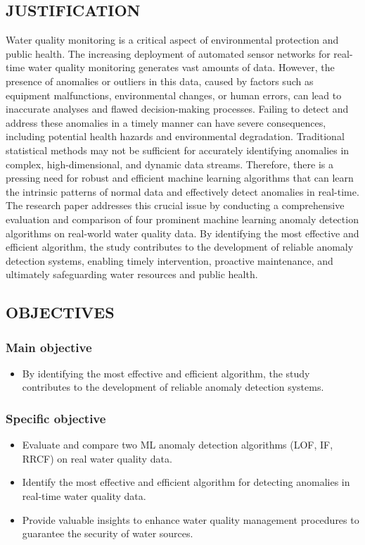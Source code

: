 \documentclass[12pt]{report}
\begin{document}
\subsection{JUSTIFICATION}
\par
Water quality monitoring is a critical aspect of environmental protection and public health. The increasing deployment of automated sensor networks for real-time water quality monitoring generates vast amounts of data. However, the presence of anomalies or outliers in this data, caused by factors such as equipment malfunctions, environmental changes, or human errors, can lead to inaccurate analyses and flawed decision-making processes. Failing to detect and address these anomalies in a timely manner can have severe consequences, including potential health hazards and environmental degradation. Traditional statistical methods may not be sufficient for accurately identifying anomalies in complex, high-dimensional, and dynamic data streams. Therefore, there is a pressing need for robust and efficient machine learning algorithms that can learn the intrinsic patterns of normal data and effectively detect anomalies in real-time. The research paper addresses this crucial issue by conducting a comprehensive evaluation and comparison of four prominent machine learning anomaly detection algorithms on real-world water quality data. By identifying the most effective and efficient algorithm, the study contributes to the development of reliable anomaly detection systems, enabling timely intervention, proactive maintenance, and ultimately safeguarding water resources and public health.
\subsection{OBJECTIVES}
\subsubsection{Main objective}
\begin{itemize}
    \item By identifying the most effective and efficient algorithm, the study contributes to the development of reliable anomaly detection systems.
\end{itemize}
\subsubsection{Specific objective}
\begin{itemize}
    \item Evaluate and compare two ML anomaly detection algorithms (LOF, IF, RRCF) on real water quality data.
\item Identify the most effective and efficient algorithm for detecting anomalies in real-time water quality data.
\item  Provide valuable insights  to enhance  water  quality  management  procedures to guarantee the  security  of  water  sources.
\end{itemize}
\end{document}
